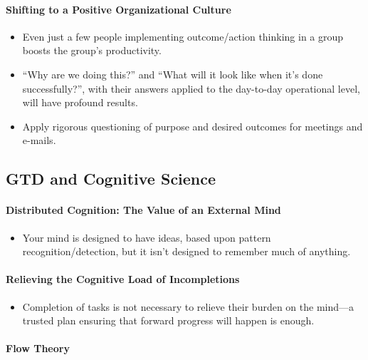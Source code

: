 \documentclass{article}
\begin{document}
\paragraph{Shifting to a Positive Organizational Culture}

\begin{itemize}
 \item Even just a few people implementing outcome/action thinking in a group boosts the group's productivity.
 \item ``Why are we doing this?'' and ``What will it look like when it's done successfully?'', with their answers applied to the day-to-day operational level, will have profound results.
 \item Apply rigorous questioning of purpose and desired outcomes for meetings and e-mails.
\end{itemize}

\subsection{GTD and Cognitive Science}

\paragraph{Distributed Cognition: The Value of an External Mind}

\begin{itemize}
 \item Your mind is designed to have ideas, based upon pattern re\-cog\-ni\-tion/de\-tec\-tion, but it isn't designed to remember much of anything.
\end{itemize}

\paragraph{Relieving the Cognitive Load of Incompletions}

\begin{itemize}
 \item Completion of tasks is not necessary to relieve their burden on the mind---a trusted plan ensuring that forward progress will happen is enough.
\end{itemize}

\paragraph{Flow Theory}
\end{document}
